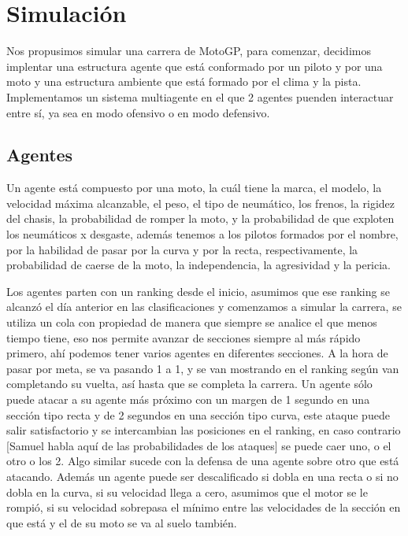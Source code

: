 \documentclass[12pt, letterpaper,spanish]{article}
\theoremstyle{definition}
\theoremstyle{remark}
\begin{document}
\section{Simulación}\cite{conferenciasS}\cite{garcia}
	Nos propusimos simular una carrera de MotoGP, para comenzar, decidimos implentar una estructura agente que está conformado por un piloto y por una moto y una estructura ambiente que está formado por el clima y la pista. Implementamos un sistema multiagente en el que 2 agentes puenden interactuar entre sí, ya sea en modo ofensivo o en modo defensivo.
	
	\subsection{Agentes}
		Un agente está compuesto por una moto, la cuál tiene la marca, el modelo, la velocidad máxima alcanzable, el peso, el tipo de neumático, los frenos, la rigidez del chasis, la probabilidad de romper la moto, y la probabilidad de que exploten los neumáticos x desgaste, además tenemos a los pilotos formados por el nombre, por la habilidad de pasar por la curva y por la recta, respectivamente, la probabilidad de caerse de la moto, la independencia, la agresividad y la pericia.
		
		Los agentes parten con un ranking desde el inicio, asumimos que ese ranking se alcanzó el día anterior en las clasificaciones y comenzamos a simular la carrera, se utiliza un cola con propiedad de manera que siempre se analice el que menos tiempo tiene, eso nos permite avanzar de secciones siempre al más rápido primero, ahí podemos tener varios agentes en diferentes secciones. A la hora de pasar por meta, se va pasando 1 a 1, y se van mostrando en el ranking según van completando su vuelta, así hasta que se completa la carrera. Un agente sólo puede atacar a su agente más próximo con un margen de 1 segundo en una sección tipo recta y de 2 segundos en una sección tipo curva, este ataque puede salir satisfactorio y se intercambian las posiciones en el ranking, en caso contrario [Samuel habla aquí de las probabilidades de los ataques] se puede caer uno, o el otro o los 2. Algo similar sucede con la defensa de una agente sobre otro que está atacando. Además un agente puede ser descalificado si dobla en una recta o si no dobla en la curva, si su velocidad llega a cero, asumimos que el motor se le rompió, si su velocidad sobrepasa el mínimo entre las velocidades de la sección en que está y el de su moto se va al suelo también.
	
\end{document}
